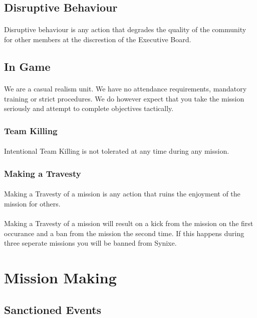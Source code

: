 \documentclass[10pt,a4paper]{article}
\begin{document}
\subsection{Disruptive Behaviour}
\paragraph{}
Disruptive behaviour is any action that degrades the quality of the community for other members at the discrestion of the Executive Board.
\subsection{In Game}
\paragraph{}
We are a casual realism unit. We have no attendance requirements, mandatory training or strict procedures. We do however expect that you take the mission seriously and attempt to complete objectives tactically.
\subsubsection{Team Killing}
\paragraph{}
Intentional Team Killing is not tolerated at any time during any mission.
\subsubsection{Making a Travesty}
\paragraph{}
Making a Travesty of a mission is any action that ruins the enjoyment of the mission for others.
\paragraph{}
Making a Travesty of a mission will result on a kick from the mission on the first occurance and a ban from the mission the second time. If this happens during three seperate missions you will be banned from Synixe.
\section{Mission Making}
\subsection{Sanctioned Events}
\end{document}
